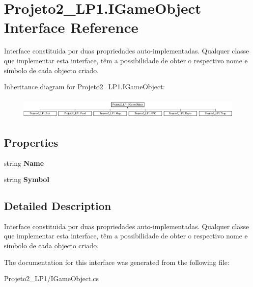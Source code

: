 \hypertarget{interface_projeto2___l_p1_1_1_i_game_object}{}\section{Projeto2\+\_\+\+L\+P1.\+I\+Game\+Object Interface Reference}
\label{interface_projeto2___l_p1_1_1_i_game_object}


Interface constituida por duas propriedades auto-\/implementadas. Qualquer classe que implementar esta interface, têm a possibilidade de obter o respectivo nome e símbolo de cada objecto criado.  


Inheritance diagram for Projeto2\+\_\+\+L\+P1.\+I\+Game\+Object\+:\begin{figure}[H]
\begin{center}
\leavevmode
\includegraphics[height=1.085271cm]{interface_projeto2___l_p1_1_1_i_game_object}
\end{center}
\end{figure}
\subsection*{Properties}
\begin{DoxyCompactItemize}
\item 
\mbox{\label{interface_projeto2___l_p1_1_1_i_game_object_a404a412c070b64e471e3556f109f5577}} 
string {\bfseries Name}
\item 
\mbox{\label{interface_projeto2___l_p1_1_1_i_game_object_a94743ab2749ea944ceff5a9efbc549a4}} 
string {\bfseries Symbol}
\end{DoxyCompactItemize}


\subsection{Detailed Description}
Interface constituida por duas propriedades auto-\/implementadas. Qualquer classe que implementar esta interface, têm a possibilidade de obter o respectivo nome e símbolo de cada objecto criado. 



The documentation for this interface was generated from the following file\+:\begin{DoxyCompactItemize}
\item 
Projeto2\+\_\+\+L\+P1/I\+Game\+Object.\+cs\end{DoxyCompactItemize}
